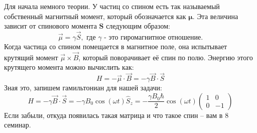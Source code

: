Для начала немного теории. У частиц со спином есть так называемый собственный магнитный момент, который обозначается как $\boldsymbol{\mu}$. Эта величина зависит от спинового момента $\mathbf{S}$ следующим образом:
\[
\vec{\mu} = \gamma \vec{S}, \text{ где $\gamma$ - это гиромагнитное отношение.}
\]
Когда частица со спином помещается в магнитное поле, она испытывает крутящий момент $\vec{\mu} \times \vec{B}$, который поворачивает её спин по полю. Энергию этого крутящего момента можно вычислить как:
\[
H = -\vec{\mu}\cdot\vec{B} = -\gamma\vec{B}\cdot\vec{S}
\]
Зная это, запишем гамильтониан для нашей задачи:
\[
H = -\gamma\vec{B}\cdot\vec{S} = -\gamma B_0\cos(\omega t) \hat{S}_z = -\frac{\gamma B_0\hbar}{2}\cos(\omega t)\begin{pmatrix} 1 & 0 \\ 0 & -1 \end{pmatrix}
\]
Если забыли, откуда появилась такая матрица и что такое спин -- вам в 8 семинар. 


